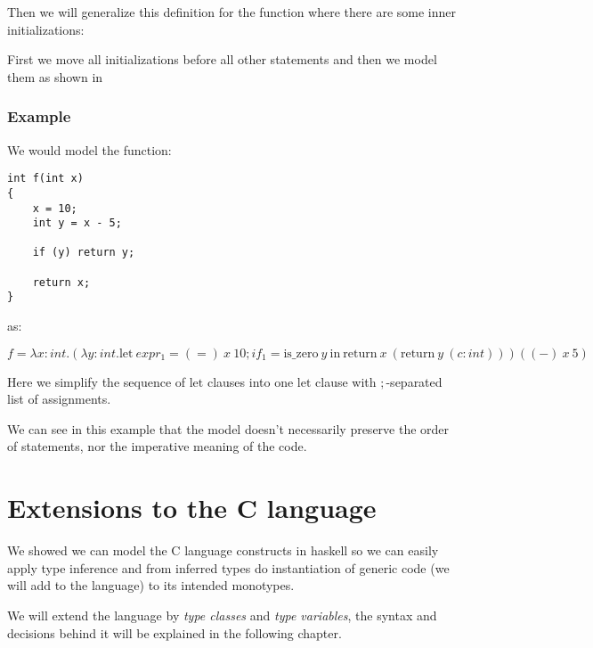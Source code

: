 Then we will generalize this definition for the function where there are some inner initializations:

First we move all initializations before all other statements and then we model them as shown in %

\subsubsection{Example}

We would model the function:

\begin{lstlisting}
int f(int x)
{
	x = 10;
	int y = x - 5;

	if (y) return y;

	return x;
}
\end{lstlisting}

as:

$f = \lambda x : int . (\lambda y : int . \text{let}\ expr_1 = (=)\ x\ 10; if_1 = \text{is\_zero}\ y\ \text{in}\ \text{return}\ x\ (\text{return}\ y\ (c : int))) ((-)\ x\ 5)$

Here we simplify the sequence of $\text{let}$ clauses into one $\text{let}$ clause with $;$-separated list of assignments.

We can see in this example that the model doesn't necessarily preserve the order of statements, nor the imperative meaning of the code.

\section{Extensions to the C language}

We showed we can model the C language constructs in haskell so we can easily apply type inference and from inferred types do instantiation of generic code (we will add to the language) to its intended monotypes.

We will extend the language by \emph{type classes} and \emph{type variables}, the syntax and decisions behind it will be explained in the following chapter.

